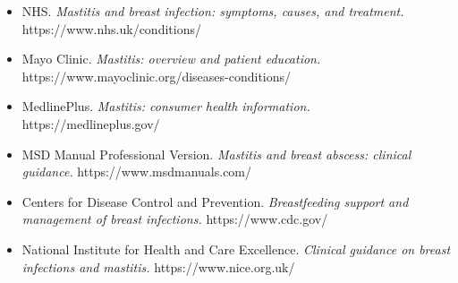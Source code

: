 \begin{itemize}
    \item NHS. \textit{Mastitis and breast infection: symptoms, causes, and treatment.} https://www.nhs.uk/conditions/
    \item Mayo Clinic. \textit{Mastitis: overview and patient education.} https://www.mayoclinic.org/diseases-conditions/
    \item MedlinePlus. \textit{Mastitis: consumer health information.} https://medlineplus.gov/
    \item MSD Manual Professional Version. \textit{Mastitis and breast abscess: clinical guidance.} https://www.msdmanuals.com/
    \item Centers for Disease Control and Prevention. \textit{Breastfeeding support and management of breast infections.} https://www.cdc.gov/
    \item National Institute for Health and Care Excellence. \textit{Clinical guidance on breast infections and mastitis.} https://www.nice.org.uk/
\end{itemize}
